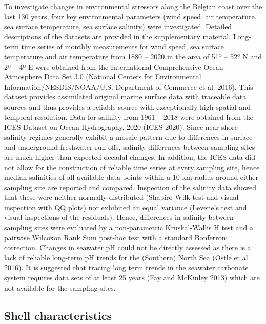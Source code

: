\documentclass[smallextended]{svjour3}       %
\begin{document}
To investigate changes in environmental stressors along the Belgian
coast over the last 130 years, four key environmental parameters (wind
speed, air temperature, sea surface temperature, sea surface salinity)
were investigated. Detailed descriptions of the datasets are provided in
the supplementary material. Long-term time series of monthly
measurements for wind speed, sea surface temperature and air temperature
from 1880 -- 2020 in the area of 51º -- 52º N and 2º -- 4º E were
obtained from the International Comprehensive Ocean-Atmosphere Data Set
3.0 (National Centers for Environmental Information/NESDIS/NOAA/U.S.
Department of Commerce et al. 2016). This dataset provides assimilated
original marine surface data with traceable data sources and thus
provides a reliable source with exceptionally high spatial and temporal
resolution. Data for salinity from 1961 -- 2018 were obtained from the
ICES Dataset on Ocean Hydrography, 2020 (ICES 2020). Since near-shore
salinity regimes generally exhibit a mosaic pattern due to differences
in surface and underground freshwater run-offs, salinity differences
between sampling sites are much higher than expected decadal changes. In
addition, the ICES data did not allow for the construction of reliable
time series at every sampling site, hence median salinities of all
available data points within a 10 km radius around either sampling site
are reported and compared. Inspection of the salinity data showed that
these were neither normally distributed (Shapiro Wilk test and visual
inspection with QQ plots) nor exhibited an equal variance (Levene's test
and visual inspections of the residuals). Hence, differences in salinity
between sampling sites were evaluated by a non-parametric Kruskal-Wallis
H test and a pairwise Wilcoxon Rank Sum post-hoc test with a standard
Bonferroni correction. Changes in seawater pH could not be directly
assessed as there is a lack of reliable long-term pH trends for the
(Southern) North Sea (Ostle et al. 2016). It is suggested that tracing
long term trends in the seawater carbonate system requires data sets of
at least 25 years (Fay and McKinley 2013) which are not available for
the sampling sites.

\hypertarget{shell-characteristics}{%
\subsection{Shell characteristics}\label{shell-characteristics}}
\end{document}
